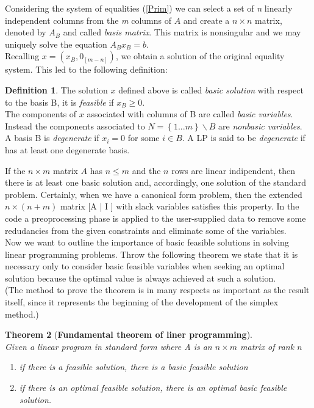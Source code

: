 \documentclass[a4paper,10 pt,titlepage,twoside]{book}
\theoremstyle{plain}
\newtheorem{thm}{Theorem}[chapter]
\theoremstyle{definition}
\newtheorem{defn}[thm]{Definition}
\theoremstyle{remark}
\begin{document}
Considering the system of equalities (\ref{Prim}) we can select a set of \textit{n} linearly independent columns from the \textit{m} columns of  $A$ and create a $n \times n$ matrix, denoted  by $A_{B}$ and called \textit{basis matrix}. This matrix is nonsingular and we may uniquely solve the equation $A_{B}x_{B} = b$. \\
Recalling $x =\left(x_{B},0_{[m-n]}\right)$, we obtain a solution of the original equality system. This led to the following definition:
\begin{defn}
	The solution $x$ defined above is called \textit{basic solution} with respect to the basis B, it is \textit{feasible} if $x_{B}\geq 0$. \\The components of $x$ associated with columns of B are called \textit{basic variables}. Instead the components associated to $N  = \left\lbrace 1...m\right\rbrace  \backslash B$ are \textit{nonbasic variables}.\\
	A basis B is \textit{degenerate} if $x_{i}= 0$ for some $i\in B$.
	A LP is said to be \textit{degenerate} if has at least one degenerate basis.
\end{defn}
If the $n \times m$ matrix $A$ has $n \leq m$ and the $n$ rows are linear indipendent, then there is at least one basic solution and, accordingly, one solution of the standard problem. Certainly, when we have a canonical form problem, then the extended $n \times (n+m)$ matrix [A | I ] with slack variables satisfies this property. In the code a preoprocessing phase is applied to the user-supplied data to remove some redudancies from the given constraints and eliminate some of the variables.\\
Now we want to outline the importance of basic feasible solutions in solving linear
programming problems.
Throw the following theorem we state that it is necessary only to consider basic feasible
variables when seeking an optimal solution because the optimal
value is always achieved at such a solution.\\ (The method to prove the theorem is in many respects as important as the result itself, since it represents the beginning of the development of the simplex
method.)
\begin{thm}[\textbf{Fundamental theorem of liner programming}] \ \\
Given a linear program in standard form where A is an $n \times m$ matrix of rank $n$
\begin{enumerate}
\item if there is a feasible solution, there is a basic feasible solution
\item if there is an optimal feasible solution, there is an optimal basic feasible solution.
\end{enumerate}
\end{thm}
\end{document}

